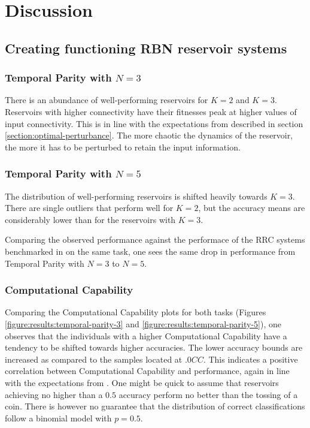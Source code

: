 \section{Discussion}

\subsection{Creating functioning RBN reservoir systems}

\subsubsection{Temporal Parity with $N=3$}
There is an abundance of well-performing reservoirs for $K=2$ and $K=3$.
Reservoirs with higher connectivity have their fitnesses peak at higher values of input connectivity.
This is in line with the expectations from \cite{rbn-reservoir} described in section \ref{section:optimal-perturbance}.
The more chaotic the dynamics of the reservoir,
the more it has to be perturbed to retain the input information.

\subsubsection{Temporal Parity with $N=5$}
The distribution of well-performing reservoirs is shifted heavily towards $K=3$.
There are single outliers that perform well for $K=2$,
but the accuracy means are considerably lower than for the reservoirs with $K=3$.

Comparing the observed performance against the performace of the RRC systems benchmarked in \cite{rbn-reservoir} on the same task,
one sees the same drop in performance from Temporal Parity with $N=3$ to $N=5$.

\subsubsection{Computational Capability}
Comparing the Computational Capability plots for both tasks (Figures \ref{figure:results:temporal-parity-3} and \ref{figure:results:temporal-parity-5}),
one observes that the individuals with a higher Computational Capability have a tendency to be shifted towards higher accuracies.
The lower accuracy bounds are increased as compared to the samples located at $.0CC$.
This indicates a positive correlation between Computational Capability and performance,
again in line with the expectations from \cite{rbn-reservoir}.
One might be quick to assume that reservoirs achieving no higher than a $0.5$ accuracy perform no better than the tossing of a coin.
There is however no guarantee that the distribution of correct classifications follow a binomial model with $p=0.5$.

